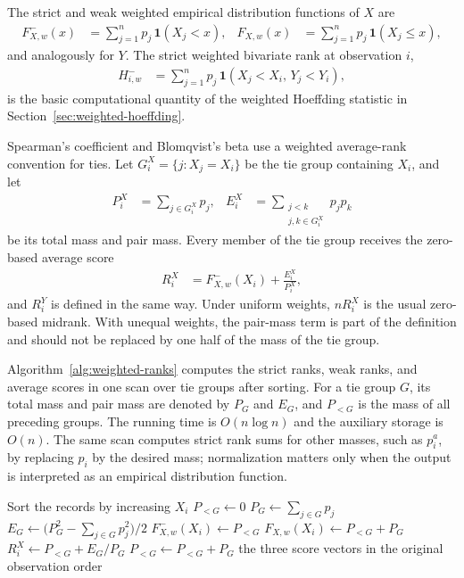 The strict and weak weighted empirical distribution functions of $X$ are
\begin{align*}
    F_{X,w}^{-}(x)
    &= \sum_{j=1}^n p_j\,\mathbf{1}(X_j<x),
    &
    F_{X,w}(x)
    &= \sum_{j=1}^n p_j\,\mathbf{1}(X_j\leq x),
\end{align*}
and analogously for $Y$. The strict weighted bivariate rank at observation
$i$,
\begin{align*}
    H_{i,w}^{-}
    &= \sum_{j=1}^n p_j\,\mathbf{1}(X_j<X_i,\,Y_j<Y_i),
\end{align*}
is the basic computational quantity of the weighted Hoeffding statistic in
Section~\ref{sec:weighted-hoeffding}.

Spearman's coefficient and Blomqvist's beta use a weighted average-rank
convention for ties. Let $G_i^X=\{j\colon X_j=X_i\}$ be the tie group
containing $X_i$, and let
\begin{align*}
    P_i^X
    &= \sum_{j\in G_i^X}p_j,
    &
    E_i^X
    &= \sum_{\substack{j<k\\ j,k\in G_i^X}}p_jp_k
\end{align*}
be its total mass and pair mass. Every member of the tie group receives the
zero-based average score
\begin{align*}
    R_i^X
    &= F_{X,w}^{-}(X_i)+\frac{E_i^X}{P_i^X},
\end{align*}
and $R_i^Y$ is defined in the same way. Under uniform weights, $nR_i^X$ is the
usual zero-based midrank. With unequal weights, the pair-mass term is part of
the definition and should not be replaced by one half of the mass of the tie
group.

Algorithm~\ref{alg:weighted-ranks} computes the strict ranks, weak ranks, and
average scores in one scan over tie groups after sorting. For a tie group $G$,
its total mass and pair mass are denoted by $P_G$ and $E_G$, and $P_{<G}$ is
the mass of all preceding groups. The running time is $O(n\log n)$ and the
auxiliary storage is $O(n)$. The same scan computes strict rank sums for other
masses, such as $p_i^a$, by replacing $p_i$ by the desired mass; normalization
matters only when the output is interpreted as an empirical distribution
function.

\begin{algorithm}[ht]
  \caption{Weighted marginal ranks and average scores}
  \label{alg:weighted-ranks}
  \small
  \begin{algorithmic}[1]
      \State Sort the records by increasing $X_i$
      \State $P_{<G}\gets0$
        \State $P_G\gets\sum_{j\in G}p_j$
        \State $E_G\gets\bigl(P_G^2-\sum_{j\in G}p_j^2\bigr)/2$
          \State $F_{X,w}^{-}(X_i)\gets P_{<G}$
          \State $F_{X,w}(X_i)\gets P_{<G}+P_G$
          \State $R_i^X\gets P_{<G}+E_G/P_G$
        \EndFor
        \State $P_{<G}\gets P_{<G}+P_G$
      \EndFor
      \State \Return the three score vectors in the original observation order
    \EndProcedure
  \end{algorithmic}
\end{algorithm}

